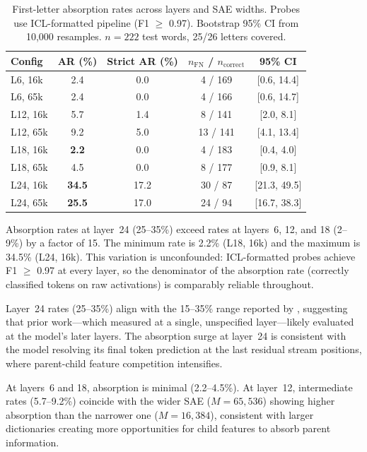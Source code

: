 \documentclass{article}
\begin{document}
\begin{table}[t]
\caption{First-letter absorption rates across layers and SAE widths. Probes use ICL-formatted pipeline (F1 $\geq$ 0.97). Bootstrap 95\% CI from 10,000 resamples. $n = 222$ test words, 25/26 letters covered.}
\label{tab:layer_absorption}
\centering
\small
\begin{tabular}{@{}lcccc@{}}
\toprule
Config & AR (\%) & Strict AR (\%) & $n_{\text{FN}}$ / $n_{\text{correct}}$ & 95\% CI \\
\midrule
L6, 16k  & 2.4  & 0.0  & 4 / 169 & [0.6, 14.4] \\
L6, 65k  & 2.4  & 0.0  & 4 / 166 & [0.6, 14.7] \\
L12, 16k & 5.7  & 1.4  & 8 / 141 & [2.0, 8.1] \\
L12, 65k & 9.2  & 5.0  & 13 / 141 & [4.1, 13.4] \\
L18, 16k & \textbf{2.2}  & 0.0  & 4 / 183 & [0.4, 4.0] \\
L18, 65k & 4.5  & 0.0  & 8 / 177 & [0.9, 8.1] \\
L24, 16k & \textbf{34.5} & 17.2 & 30 / 87  & [21.3, 49.5] \\
L24, 65k & \textbf{25.5} & 17.0 & 24 / 94  & [16.7, 38.3] \\
\bottomrule
\end{tabular}
\end{table}

Absorption rates at layer~24 (25--35\%) exceed rates at layers~6, 12, and 18 (2--9\%) by a factor of 15. The minimum rate is 2.2\% (L18, 16k) and the maximum is 34.5\% (L24, 16k). This variation is unconfounded: ICL-formatted probes achieve F1 $\geq$ 0.97 at every layer, so the denominator of the absorption rate (correctly classified tokens on raw activations) is comparably reliable throughout.

Layer~24 rates (25--35\%) align with the 15--35\% range reported by \citet{chanin2024absorption}, suggesting that prior work---which measured at a single, unspecified layer---likely evaluated at the model's later layers. The absorption surge at layer~24 is consistent with the model resolving its final token prediction at the last residual stream positions, where parent-child feature competition intensifies.

At layers~6 and 18, absorption is minimal (2.2--4.5\%). At layer~12, intermediate rates (5.7--9.2\%) coincide with the wider SAE ($M = 65{,}536$) showing higher absorption than the narrower one ($M = 16{,}384$), consistent with larger dictionaries creating more opportunities for child features to absorb parent information.
\end{document}
